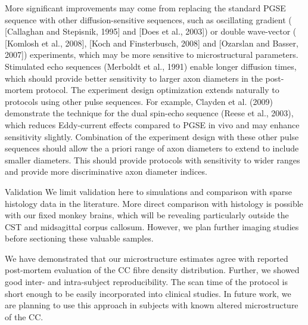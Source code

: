 More significant improvements may come from replacing the standard PGSE sequence with other diffusion-sensitive sequences, such as oscillating gradient ( [Callaghan and Stepisnik, 1995] and [Does et al., 2003]) or double wave-vector ( [Komlosh et al., 2008], [Koch and Finsterbusch, 2008] and [Ozarslan and Basser, 2007]) experiments, which may be more sensitive to microstructural parameters. Stimulated echo sequences (Merboldt et al., 1991) enable longer diffusion times, which should provide better sensitivity to larger axon diameters in the post-mortem protocol. The experiment design optimization extends naturally to protocols using other pulse sequences. For example, Clayden et al. (2009) demonstrate the technique for the dual spin-echo sequence (Reese et al., 2003), which reduces Eddy-current effects compared to PGSE in vivo and may enhance sensitivity slightly. Combination of the experiment design with these other pulse sequences should allow the a priori range of axon diameters to extend to include smaller diameters. This should provide protocols with sensitivity to wider ranges and provide more discriminative axon diameter indices.


Validation
We limit validation here to simulations and comparison with sparse histology data in the literature. More direct comparison with histology is possible with our fixed monkey brains, which will be revealing particularly outside the CST and midsagittal corpus callosum. However, we plan further imaging studies before sectioning these valuable samples.


We have demonstrated that our microstructure estimates agree with reported post-mortem evaluation of the CC fibre density distribution. Further, we showed good inter- and intra-subject reproducibility. The scan time of the protocol is short enough to be easily incorporated into clinical studies. In future work, we are planning to use this approach in subjects with known altered microstructure of the CC.